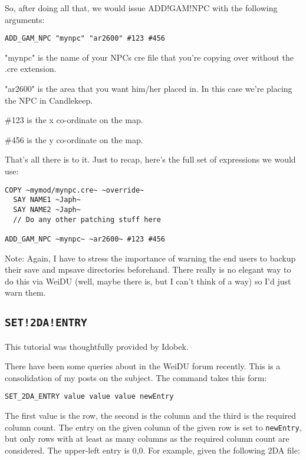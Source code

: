 \documentclass{article}
\def\ttref#1{\ahrefloc{#1}{\tt #1}}
\def\t#1{{\tt #1}}
\begin{document}
So, after doing all that, we would issue ADD!GAM!NPC with the following
arguments:

\begin{verbatim}
ADD_GAM_NPC "mynpc" "ar2600" #123 #456
\end{verbatim}

"mynpc" is the name of your NPCs cre file that you're copying over without
the .cre extension.

"ar2600" is the area that you want him/her placed in.  In this case we're
placing the NPC in Candlekeep.

\#123 is the x co-ordinate on the map.

\#456 is the y co-ordinate on the map.

That's all there is to it.  Just to recap, here's the full set of
expressions we would use:

\begin{verbatim}
COPY ~mymod/mynpc.cre~ ~override~
  SAY NAME1 ~Japh~
  SAY NAME2 ~Japh~
  // Do any other patching stuff here

ADD_GAM_NPC ~mynpc~ ~ar2600~ #123 #456
\end{verbatim}

Note: Again, I have to stress the importance of warning the end users to
backup their save and mpsave directories beforehand.  There really is no
elegant way to do this via WeiDU (well, maybe there is, but I can't think
of a way) so I'd just warn them.

\subsection{\t{SET!2DA!ENTRY}}

This tutorial was thoughtfully provided by Idobek.

There have been some queries about \ttref{SET!2DA!ENTRY} in the WeiDU
forum recently. This is a consolidation of my posts on the subject.
The command takes this form:

\begin{verbatim}
SET_2DA_ENTRY value value value newEntry
\end{verbatim}

The first value is the row, the second is the column and the third is the
required column count. The entry on the given column of the given row is
set to \t{newEntry}, but only rows with at least as many columns as the
required column count are considered. The upper-left entry is 0,0. For
example, given the following 2DA file:
\end{document}

